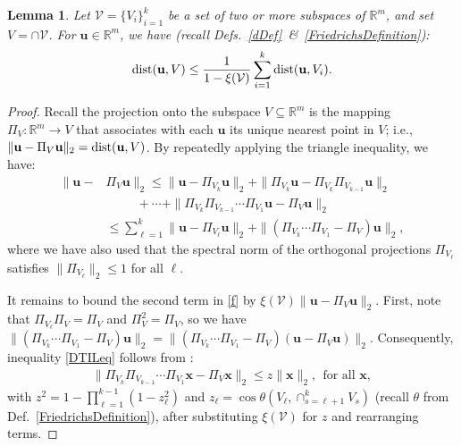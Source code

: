 \documentclass[journal, twocolumn]{IEEEtran}
\newtheorem{lemma}{Lemma}
\begin{document}
\begin{lemma}\label{DistanceToIntersectionLemma}
Let $\mathcal{V} = \{V_i\}_{i=1}^k$ be a set of two or more subspaces of $\mathbb{R}^m$, and set $V = \cap \mathcal{V} $. For  $\mathbf{u} \in \mathbb{R}^m$, we have (recall Defs.~\ref{dDef}~\&~\ref{FriedrichsDefinition}):
\begin{align}\label{DTILeq}
\text{\rm dist}(\mathbf{u}, V) \leq \frac{1}{1 - \xi(\mathcal{V})} \sum_{i=1}^k \text{\rm dist}(\mathbf{u}, V_i).
\end{align}
\end{lemma}
\begin{proof} 
Recall the projection onto the subspace $V \subseteq \mathbb{R}^m$ is the mapping $\Pi_V: \mathbb{R}^m \to V$ that associates with each $\mathbf{u}$ its unique nearest point in $V$; i.e., $\|\mathbf{u} - \Pi_V\mathbf{u}\|_2 = \text{\rm dist}(\mathbf{u}, V)$.
By repeatedly applying the triangle inequality, we have:
\begin{align}\label{f}
\|\mathbf{u} - &\Pi_V\mathbf{u}\|_2 
\leq \|\mathbf{u} - \Pi_{V_k} \mathbf{u}\|_2 + \|\Pi_{V_k}  \mathbf{u} - \Pi_{V_k}\Pi_{V_{k-1}}\mathbf{u}\|_2 \nonumber \\
&\ \ \ \ \ \ \ \ \ \ \ + \cdots + \|\Pi_{V_k} \Pi_{V_{k-1}}\cdots \Pi_{V_1} \mathbf{u} - \Pi_V \mathbf{u}\|_2 \nonumber \\
&\leq  \sum_{\ell=1}^k \|\mathbf{u} - \Pi_{V_{\ell}} \mathbf{u}\|_2 
+ \|(\Pi_{V_k}\cdots\Pi_{V_{1}} - \Pi_V) \mathbf{u}\|_2,
\end{align}
where we have also used that the spectral norm of the orthogonal projections $\Pi_{V_{\ell}}$ satisfies $\|\Pi_{V_{\ell}}\|_2 \leq 1$ for all $\ell$. 

It remains to bound the second term in \eqref{f} by $\xi(\mathcal{V}) \|\mathbf{u} - \Pi_V\mathbf{u}\|_2$. First, note that $\Pi_{V_\ell} \Pi_V = \Pi_V$ and $\Pi_V^2 = \Pi_V$, so we have $\|(\Pi_{V_k} \cdots \Pi_{V_1} - \Pi_V) \mathbf{u} \|_2 
= \| ( \Pi_{V_k} \cdots\Pi_{V_1} - \Pi_V ) (\mathbf{u} - \Pi_V\mathbf{u})\|_2$. %
Consequently, inequality \eqref{DTILeq} follows from \cite[Thm.~9.33]{Deutsch12}:
\begin{align}
\|\Pi_{V_k}\Pi_{V_{k-1}}\cdots\Pi_{V_1} \mathbf{x} - \Pi_V\mathbf{x}\|_2 \leq z \|\mathbf{x}\|_2, \ \ \text{for all } \mathbf{x},
\end{align}
with \mbox{$z^2= 1 - \prod_{\ell =1}^{k-1}(1-z_{\ell}^2)$} and \mbox{$z_{\ell} = \cos\theta\left(V_{\ell}, \cap_{s=\ell+1}^k V_s\right)$} (recall $\theta$ from Def.~\ref{FriedrichsDefinition}), after substituting $\xi(\mathcal{V})$ for $z$ and rearranging terms.
\end{proof}
\end{document}
